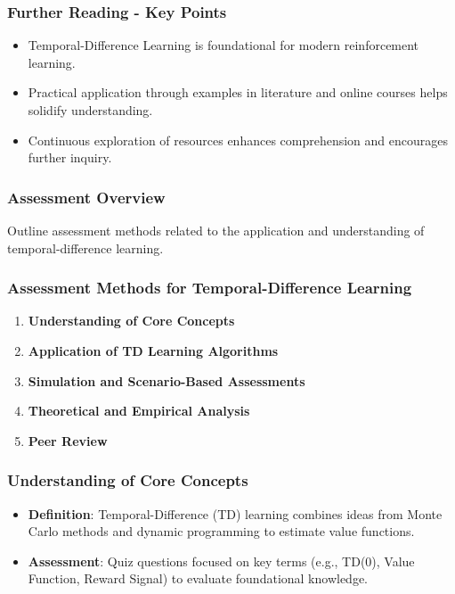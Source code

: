 \documentclass[aspectratio=169]{beamer}
\begin{document}
\begin{frame}[fragile]
    \frametitle{Further Reading - Key Points}
    \begin{itemize}
        \item Temporal-Difference Learning is foundational for modern reinforcement learning.
        \item Practical application through examples in literature and online courses helps solidify understanding.
        \item Continuous exploration of resources enhances comprehension and encourages further inquiry.
    \end{itemize}
\end{frame}

\begin{frame}[fragile]
    \frametitle{Assessment Overview}
    Outline assessment methods related to the application and understanding of temporal-difference learning.
\end{frame}

\begin{frame}[fragile]
    \frametitle{Assessment Methods for Temporal-Difference Learning}
    
    \begin{enumerate}
        \item \textbf{Understanding of Core Concepts}
        \item \textbf{Application of TD Learning Algorithms}
        \item \textbf{Simulation and Scenario-Based Assessments}
        \item \textbf{Theoretical and Empirical Analysis}
        \item \textbf{Peer Review}
    \end{enumerate}
\end{frame}

\begin{frame}[fragile]
    \frametitle{Understanding of Core Concepts}
    \begin{itemize}
        \item \textbf{Definition}: Temporal-Difference (TD) learning combines ideas from Monte Carlo methods and dynamic programming to estimate value functions.
        \item \textbf{Assessment}: Quiz questions focused on key terms (e.g., TD(0), Value Function, Reward Signal) to evaluate foundational knowledge.
    \end{itemize}
\end{frame}
\end{document}

